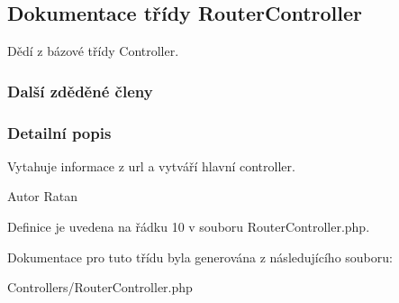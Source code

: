 \hypertarget{class_router_controller}{\subsection{Dokumentace třídy Router\-Controller}
\label{class_router_controller}
}


Dědí z bázové třídy Controller.

\subsubsection*{Další zděděné členy}


\subsubsection{Detailní popis}
Vytahuje informace z url a vytváří hlavní controller. \begin{DoxyAuthor}{Autor}
Ratan 
\end{DoxyAuthor}


Definice je uvedena na řádku 10 v souboru Router\-Controller.\-php.



Dokumentace pro tuto třídu byla generována z následujícího souboru\-:\begin{DoxyCompactItemize}
\item 
Controllers/Router\-Controller.\-php\end{DoxyCompactItemize}
